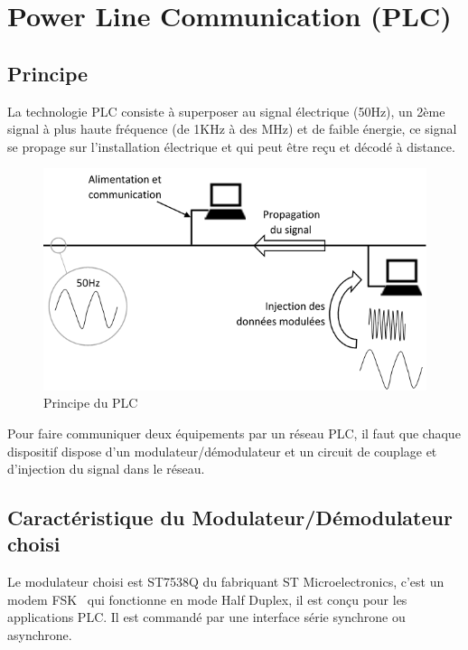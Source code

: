 \documentclass[11pt, a4paper, twoside]{book}
\begin{document}
\section{Power Line Communication (PLC)}
\subsection{Principe}
La technologie PLC consiste à superposer au signal électrique (50Hz), un 2ème signal à plus haute fréquence (de 1KHz à des MHz) et de faible énergie, ce signal se propage sur l'installation électrique et qui peut être reçu et décodé à distance.
\begin{figure}[H]
\centering
\includegraphics[width=\textwidth]{PLC}
\caption{Principe du PLC}
\end{figure}
Pour faire communiquer deux équipements par un réseau PLC, il faut que chaque dispositif dispose d’un modulateur/démodulateur et un circuit de couplage et d'injection du signal dans le réseau.
\subsection{Caractéristique du Modulateur/Démodulateur choisi}
Le modulateur choisi est ST7538Q du fabriquant ST Microelectronics, c'est un modem FSK
\footnotemark \ qui fonctionne en mode Half Duplex, il est conçu pour les applications PLC. Il est commandé par une interface série synchrone ou asynchrone.\\
\end{document}

